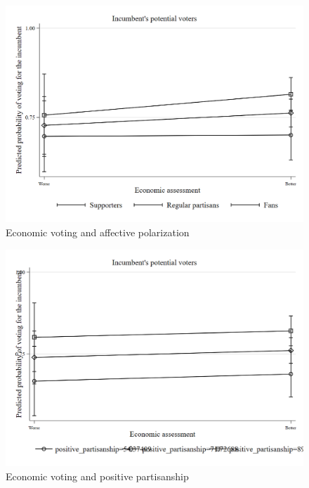 \documentclass[a4paper, svgnames]{article}
\begin{document}
\begin{figure}[H]
	\centering
	\includegraphics[scale=0.35]{Figures/margins.png}
	\caption{\label{fig:margins} Economic voting and affective polarization }
\end{figure}

\begin{figure}[H]
	\centering
	\includegraphics[scale=0.35]{Figures/positive_margins.png}
	\caption{\label{fig:positive-margins} Economic voting and positive partisanship}
\end{figure}
\end{document}
